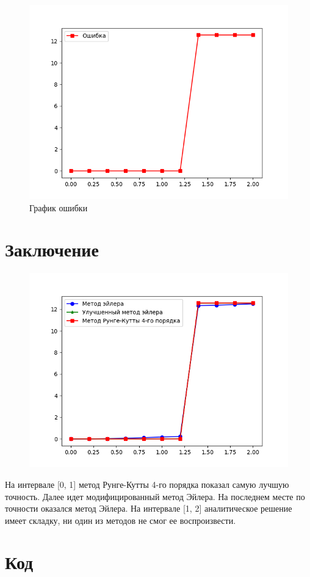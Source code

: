 \documentclass[a4paper, 14pt, fleqn]{extarticle}
\begin{document}
				\begin{figure}[h]
					\centering
					\includegraphics[width = 0.6\linewidth]{rk4-error.png}
					\caption{График ошибки}
				\end{figure}
			
	\pagebreak
	
	\section{Заключение}
	
		\begin{figure}[h]
			\centering
			\includegraphics[width = 0.9\linewidth]{error-union.png}
		\end{figure}
	
		На интервале [0, 1] метод Рунге-Кутты 4-го порядка показал самую лучшую точность. Далее идет модифицированный метод Эйлера. На последнем месте по точности оказался метод Эйлера. На интервале [1, 2] аналитическое решение имеет складку, ни один из методов не смог ее воспроизвести.
	\pagebreak
	\section{Код}
	
	
	
\end{document}
